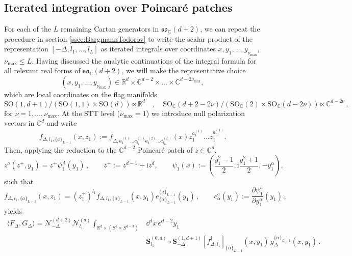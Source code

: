 \documentclass{article}
\def\bC{\mathbb{C}}
\def \Dg {\Delta}
\def \ds {\partial}
\def \ag {\alpha}
\def \Rs {\mathbb{R}}
\def \Cs {\mathbb{C}}
\begin{document}
    \subsection{Iterated integration over Poincaré patches}
    \label{ssec:nested_poincare}
    For each of the $L$ remaining Cartan generators in $\mathfrak{so}_{\Cs}(d+2)$, we can repeat the procedure in section \ref{ssec:BargmannTodorov} to write the scalar product of the representation $[-\Dg,l_1,\dots,l_L]$ as iterated integrals over coordinates $x,y_1,\dots,y_{\nu_{\mathrm{max}}}$, $\nu_{\mathrm{max}} \leq L$. Having discussed the analytic continuations of the integral formula for all relevant real forms of $\mathfrak{so}_{\Cs}(d+2)$, we will make the representative choice 
    \begin{equation}
    (x,y_1,\dots,y_{\nu_{\mathrm{max}}}) \in \Rs^d \times \Cs^{d-2} \times \dots \times \Cs^{d-2 \nu_{\mathrm{max}}},
    \label{x,y,...,y}
    \end{equation}
    which are local coordinates on the flag manifolds
\begin{equation} 
\mathrm{SO}(1,d+1)/(\mathrm{SO}(1,1) \times \mathrm{SO}(d))\ltimes \mathbb{R}^d 
\quad , \quad 
\mathrm{SO}_\bC(d+2-2\nu)/(\mathrm{SO}_\bC(2) \times \mathrm{SO}_\bC(d-2\nu))\ltimes 
\mathbb{C}^{d-2\nu} \,,
\end{equation}  
for $\nu = 1, \dots, \nu_{\mathrm{max}}$. At the STT level ($\nu_{\mathrm{max}}=1$) we introduce null polarization vectors in $\Cs^d$ and write
    \begin{equation}
        f_{\Dg,l_1,\{a\}_{L-1}}(x,z_1) := f_{\Dg,a_1^{(1)}\dots a_{l_1}^{(1)} a_{1}^{(2)} \dots a_{l_L}^{(L)}}(x) z_1^{a_1^{(1)}}  \dots z_1^{a_{l_1}^{(1)}}. 
    \end{equation}
    Then, applying the reduction to the $\Cs^{d-2}$ Poincaré patch of $z \in \Cs^{d}$,
\begin{equation}
z^a(z^+,y_1) = z^+ \psi_1^A(y_1)\,, \qquad z^+ := z^{d-1}+\mathrm{i} z^{d}, \qquad \psi_1(x) := \left(\frac{y_1^2-1}{2}, \mathrm{i}\frac{y_1^2+1}{2}, -y_1^{\ag} \right) ,
\end{equation}
    such that
    \begin{equation}
    f_{\Dg,l_1,\{a\}_{L-1}}(x,z_1) = (z_1^+)^{l_1} f_{\Dg,l_1,\{\ag\}_{L-1}}(x,y_1) e^{\{a\}_{L-1}}_{\{\ag\}_{L-1}}(y_1)\,, \qquad e^a_{\ag}(y_1) := \frac{\ds \psi_1^a}{\ds y_1^{\ag}}(y_1)\,,
    \end{equation}
    yields
    \begin{align}
        \langle F_{\Dg}, G_{\Dg} \rangle = \mathcal{N}^{(d+2)}_{-\Dg} \mathcal{N}^{(d)}_{l_1} \int_{\Rs^d \times (S^1\times S^{d-3})}& \dd^d x\, \dd^{d-2} y_1 \nonumber \\
        & \mathbf{S}^{(0,d)}_{l_1} \circ \mathbf{S}^{(1,d+1)}_{-\Dg}[f_{\Dg,l_1}^{\dagger}]_{\{\ag\}_{L-1}} (x,y_1) \, g_{\Dg}^{\{\ag\}_{L-1}}(x,y_1)\,.
        \label{full_isospin_integral}
    \end{align}
\end{document}
